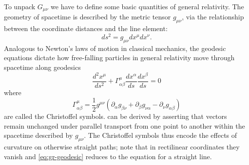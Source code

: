 To unpack $G_{\mu\nu}$ we have to define some basic quantities of general relativity.
The geometry of spacetime is described by the metric tensor $g_{\mu\nu}$, via the relationship between the coordinate distances and the line element:
\begin{equation}
	ds^2 = g_{\mu\nu}dx^{\mu}dx^{\nu}.
\end{equation}
Analogous to Newton's laws of motion in classical mechanics, the geodesic equations dictate how free-falling particles in general relativity move through spacetime along geodesics
\begin{equation}\label{eq:gr-geodesic}
	\frac{d^2x^{\mu}}{ds^2} + \Gamma_{\alpha \beta}^{\mu} \frac{dx^{\alpha}}{ds} \frac{dx^{\beta}}{ds} = 0
\end{equation}
where
\begin{equation}\label{eq:gr-christoffel}
	\Gamma_{\alpha \beta}^{\mu} = \frac{1}{2} g^{\mu\nu} \left( \partial_{\alpha} g_{\beta\nu} + \partial_{\beta} g_{\nu\alpha} - \partial_{\nu} g_{\alpha\beta} \right)
\end{equation}
are called the Christoffel symbols.
 can be derived by asserting that vectors remain unchanged under parallel transport from one point to another within the spacetime described by $g_{\mu\nu}$.
The Christoffel symbols thus encode the effects of curvature on otherwise straight paths; note that in rectilinear coordinates they vanish and \cref{eq:gr-geodesic} reduces to the equation for a straight line.

